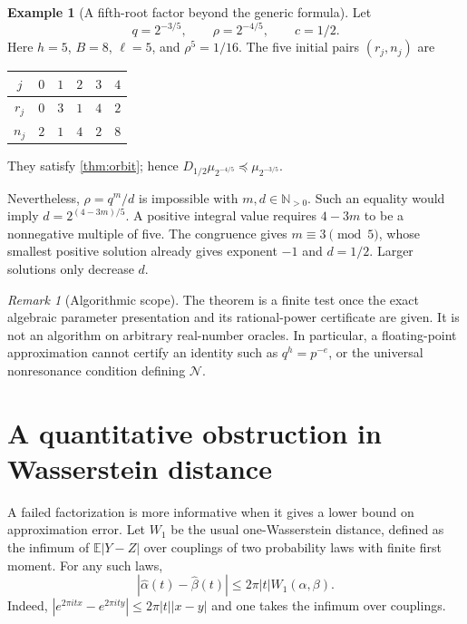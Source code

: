 \documentclass[11pt,letterpaper]{article}
\theoremstyle{definition}
\newtheorem{example}[theorem]{Example}
\theoremstyle{remark}
\newtheorem{remark}[theorem]{Remark}
\newcommand{\Np}{\mathbb N_{>0}}
\newcommand{\E}{\mathbb E}
\newcommand{\NR}{\mathcal N}
\numberwithin{equation}{section}
\begin{document}
\begin{example}[A fifth-root factor beyond the generic formula]\label{ex:fifth}
Let
\[
 q=2^{-3/5},\qquad \rho=2^{-4/5},\qquad c=1/2.
\]
Here $h=5$, $B=8$, $\ell=5$, and $\rho^5=1/16$. The five initial pairs $(r_j,n_j)$ are
\begin{center}
\begin{tabular}{c|rrrrr}
$j$ & $0$ & $1$ & $2$ & $3$ & $4$\\\hline
$r_j$ & $0$ & $3$ & $1$ & $4$ & $2$\\
$n_j$ & $2$ & $1$ & $4$ & $2$ & $8$
\end{tabular}
\end{center}
They satisfy \cref{thm:orbit}; hence $D_{1/2}\mu_{2^{-4/5}}\preceq\mu_{2^{-3/5}}$.

Nevertheless, $\rho=q^m/d$ is impossible with $m,d\in\Np$. Such an equality would imply $d=2^{(4-3m)/5}$. A positive integral value requires $4-3m$ to be a nonnegative multiple of five. The congruence gives $m\equiv3\pmod5$, whose smallest positive solution already gives exponent $-1$ and $d=1/2$. Larger solutions only decrease $d$.
\end{example}

\begin{remark}[Algorithmic scope]
The theorem is a finite test once the exact algebraic parameter presentation and its rational-power certificate are given. It is not an algorithm on arbitrary real-number oracles. In particular, a floating-point approximation cannot certify an identity such as $q^h=p^{-e}$, or the universal nonresonance condition defining $\NR$.
\end{remark}

\section{A quantitative obstruction in Wasserstein distance}\label{sec:metric}
A failed factorization is more informative when it gives a lower bound on approximation error. Let $W_1$ be the usual one-Wasserstein distance, defined as the infimum of $\E|Y-Z|$ over couplings of two probability laws with finite first moment. For any such laws,
\begin{equation}\label{eq:Wchar}
 |\widehat\alpha(t)-\widehat\beta(t)|\le2\pi|t|W_1(\alpha,\beta).
\end{equation}
Indeed, $|e^{2\pi itx}-e^{2\pi ity}|\le2\pi|t||x-y|$ and one takes the infimum over couplings.
\end{document}
